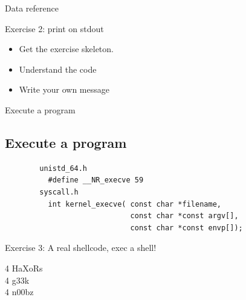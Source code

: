 \begin{frame}{Data reference}
	\begin{block}{Exercise 2: print on stdout}
		\begin{itemize}
			\item Get the exercise skeleton.
			\item \alert{Understand the code}
			\item Write your own message
		\end{itemize}
	\end{block}

\end{frame}

\begin{frame}[fragile]{Execute a program}
	\subsection{Execute a program}
	\ccode
	\begin{lstlisting}
		unistd_64.h
		  #define __NR_execve 59
		syscall.h
		  int kernel_execve( const char *filename,
		                     const char *const argv[],
		                     const char *const envp[]);
	\end{lstlisting}

	\begin{block}{Exercise 3: A real shellcode, exec a shell!}
		\begin{description}
			\item[4 HaXoRs]
			\item[4 g33k]
			\item[4 n00bz]
		\end{description}
	\end{block}

\end{frame}

